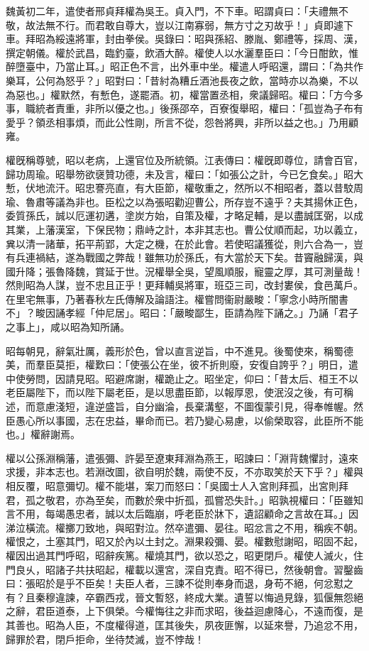 \begin{pinyinscope}
魏黃初二年，遣使者邢貞拜權為吳王。貞入門，不下車。昭謂貞曰：「夫禮無不敬，故法無不行。而君敢自尊大，豈以江南寡弱，無方寸之刃故乎！」貞即遽下車。拜昭為綏遠將軍，封由拳侯。吳錄曰：昭與孫紹、滕胤、鄭禮等，採周、漢，撰定朝儀。權於武昌，臨釣臺，飲酒大醉。權使人以水灑羣臣曰：「今日酣飲，惟醉墮臺中，乃當止耳。」昭正色不言，出外車中坐。權遣人呼昭還，謂曰：「為共作樂耳，公何為怒乎？」昭對曰：「昔紂為糟丘酒池長夜之飲，當時亦以為樂，不以為惡也。」權默然，有慙色，遂罷酒。初，權當置丞相，衆議歸昭。權曰：「方今多事，職統者責重，非所以優之也。」後孫邵卒，百寮復舉昭，權曰：「孤豈為子布有愛乎？領丞相事煩，而此公性剛，所言不從，怨咎將興，非所以益之也。」乃用顧雍。

權旣稱尊號，昭以老病，上還官位及所統領。江表傳曰：權旣即尊位，請會百官，歸功周瑜。昭舉笏欲襃贊功德，未及言，權曰：「如張公之計，今已乞食矣。」昭大慙，伏地流汗。昭忠謇亮直，有大臣節，權敬重之，然所以不相昭者，蓋以昔駮周瑜、魯肅等議為非也。臣松之以為張昭勸迎曹公，所存豈不遠乎？夫其揚休正色，委質孫氏，誠以厄運初遘，塗炭方始，自策及權，才略足輔，是以盡誠匡弼，以成其業，上藩漢室，下保民物；鼎峙之計，本非其志也。曹公仗順而起，功以義立，兾以清一諸華，拓平荊郢，大定之機，在於此會。若使昭議獲從，則六合為一，豈有兵連禍結，遂為戰國之弊哉！雖無功於孫氏，有大當於天下矣。昔竇融歸漢，與國升降；張魯降魏，賞延于世。況權舉全吳，望風順服，寵靈之厚，其可測量哉！然則昭為人謀，豈不忠且正乎！更拜輔吳將軍，班亞三司，改封婁侯，食邑萬戶。在里宅無事，乃著春秋左氏傳解及論語注。權嘗問衞尉嚴畯：「寧念小時所闇書不」？畯因誦孝經「仲尼居」。昭曰：「嚴畯鄙生，臣請為陛下誦之。」乃誦「君子之事上」，咸以昭為知所誦。

昭每朝見，辭氣壯厲，義形於色，曾以直言逆旨，中不進見。後蜀使來，稱蜀德美，而羣臣莫拒，權歎曰：「使張公在坐，彼不折則廢，安復自誇乎？」明日，遣中使勞問，因請見昭。昭避席謝，權跪止之。昭坐定，仰曰：「昔太后、桓王不以老臣屬陛下，而以陛下屬老臣，是以思盡臣節，以報厚恩，使泯沒之後，有可稱述，而意慮淺短，違逆盛旨，自分幽淪，長棄溝壑，不圖復蒙引見，得奉帷幄。然臣愚心所以事國，志在忠益，畢命而已。若乃變心易慮，以偷榮取容，此臣所不能也。」權辭謝焉。

權以公孫淵稱藩，遣張彌、許晏至遼東拜淵為燕王，昭諫曰：「淵背魏懼討，遠來求援，非本志也。若淵改圖，欲自明於魏，兩使不反，不亦取笑於天下乎？」權與相反覆，昭意彌切。權不能堪，案刀而怒曰：「吳國士人入宮則拜孤，出宮則拜君，孤之敬君，亦為至矣，而數於衆中折孤，孤嘗恐失計。」昭孰視權曰：「臣雖知言不用，每竭愚忠者，誠以太后臨崩，呼老臣於牀下，遺詔顧命之言故在耳。」因涕泣橫流。權擲刀致地，與昭對泣。然卒遣彌、晏往。昭忿言之不用，稱疾不朝。權恨之，土塞其門，昭又於內以土封之。淵果殺彌、晏。權數慰謝昭，昭固不起，權因出過其門呼昭，昭辭疾篤。權燒其門，欲以恐之，昭更閉戶。權使人滅火，住門良乆，昭諸子共扶昭起，權載以還宮，深自克責。昭不得已，然後朝會。習鑿齒曰：張昭於是乎不臣矣！夫臣人者，三諫不從則奉身而退，身苟不絕，何忿懟之有？且秦穆違諫，卒霸西戎，晉文暫怒，終成大業。遺誓以悔過見錄，狐偃無怨絕之辭，君臣道泰，上下俱榮。今權悔往之非而求昭，後益迴慮降心，不遠而復，是其善也。昭為人臣，不度權得道，匡其後失，夙夜匪懈，以延來譽，乃追忿不用，歸罪於君，閉戶拒命，坐待焚滅，豈不悖哉！


\end{pinyinscope}
